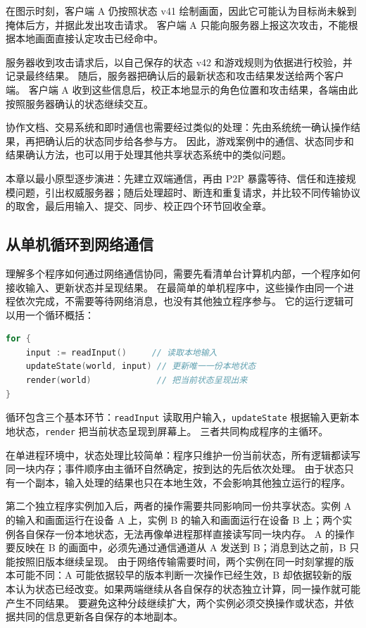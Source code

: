 在图示时刻，客户端 A 仍按照状态 v41 绘制画面，因此它可能认为目标尚未躲到掩体后方，并据此发出攻击请求。
客户端 A 只能向服务器上报这次攻击，不能根据本地画面直接认定攻击已经命中。

服务器收到攻击请求后，以自己保存的状态 v42 和游戏规则为依据进行校验，并记录最终结果。
随后，服务器把确认后的最新状态和攻击结果发送给两个客户端。
客户端 A 收到这些信息后，校正本地显示的角色位置和攻击结果，各端由此按照服务器确认的状态继续交互。

协作文档、交易系统和即时通信也需要经过类似的处理：先由系统统一确认操作结果，再把确认后的状态同步给各参与方。
因此，游戏案例中的通信、状态同步和结果确认方法，也可以用于处理其他共享状态系统中的类似问题。

本章以最小原型逐步演进：先建立双端通信，再由 P2P 暴露等待、信任和连接规模问题，引出权威服务器；随后处理超时、断连和重复请求，并比较不同传输协议的取舍，最后用输入、提交、同步、校正四个环节回收全章。

\subsection{从单机循环到网络通信}\label{sec2:local-to-online}

理解多个程序如何通过网络通信协同，需要先看清单台计算机内部，一个程序如何接收输入、更新状态并呈现结果。
在最简单的单机程序中，这些操作由同一个进程依次完成，不需要等待网络消息，也没有其他独立程序参与。
它的运行逻辑可以用一个循环概括：

\begin{tcolorbox}[title=单进程状态循环（概念示例）]
\begin{lstlisting}[style=codeblock, language=go]
for {
    input := readInput()     // 读取本地输入
    updateState(world, input) // 更新唯一一份本地状态
    render(world)             // 把当前状态呈现出来
}
\end{lstlisting}
\end{tcolorbox}

循环包含三个基本环节：\texttt{readInput} 读取用户输入，\texttt{updateState} 根据输入更新本地状态，\texttt{render} 把当前状态呈现到屏幕上。
三者共同构成程序的主循环。

在单进程环境中，状态处理比较简单：程序只维护一份当前状态，所有逻辑都读写同一块内存；事件顺序由主循环自然确定，按到达的先后依次处理。
由于状态只有一个副本，输入处理的结果也只在本地生效，不会影响其他独立运行的程序。

第二个独立程序实例加入后，两者的操作需要共同影响同一份共享状态。实例 A 的输入和画面运行在设备 A 上，实例 B 的输入和画面运行在设备 B 上；两个实例各自保存一份本地状态，无法再像单进程那样直接读写同一块内存。
A 的操作要反映在 B 的画面中，必须先通过通信通道从 A 发送到 B；消息到达之前，B 只能按照旧版本继续呈现。
由于网络传输需要时间，两个实例在同一时刻掌握的版本可能不同：A 可能依据较早的版本判断一次操作已经生效，B 却依据较新的版本认为状态已经改变。如果两端继续从各自保存的状态独立计算，同一操作就可能产生不同结果。
要避免这种分歧继续扩大，两个实例必须交换操作或状态，并依据共同的信息更新各自保存的本地副本。

